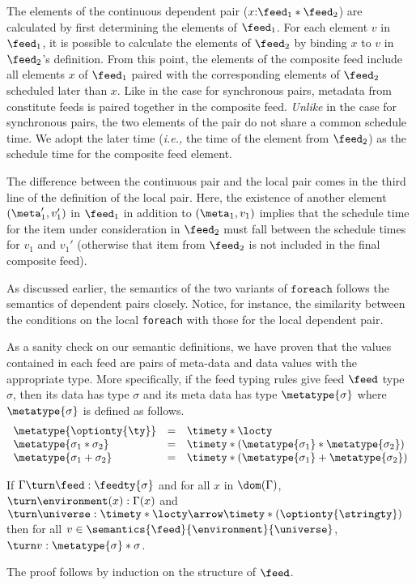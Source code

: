The elements of the continuous dependent pair ($x{:}\feed_1 * \feed_2$)
are calculated by first determining the elements of $\feed_1$. 
For each element $v$ in $\feed_1$, it is possible to calculate
the elements of $\feed_2$ by binding $x$ to $v$ in $\feed_2$'s definition.
From this point, the elements of the composite feed include all elements
$x$ of $\feed_1$ paired with the corresponding elements of $\feed_2$ scheduled
later than $x$.  Like in the case for synchronous pairs, metadata from 
constitute feeds is paired together in the composite feed.  {\em Unlike}
in the case for synchronous pairs, the two elements of the pair do
not share a common schedule time.  We adopt the later time ({\em i.e.,}
the time of the element from $\feed_2$) as the schedule time for the
composite feed element.

The difference between the continuous pair and the local pair
comes in the third line of the definition of the local pair.
Here, the existence of another element $(\meta_1',v_1')$
in $\feed_1$ in addition to $(\meta_1,v_1)$ implies that the 
schedule time for the item under consideration in $\feed_2$
must fall between the schedule times for $v_1$ and $v_1'$
(otherwise that item from $\feed_2$ is not included in the
final composite feed). 

As discussed earlier, the semantics of the two variants of $\mathtt{foreach}$
follows the semantics of dependent pairs closely.  Notice, for instance,
the similarity between the conditions on the local {\tt foreach} with those
for the local dependent pair.

As a sanity check on our semantic definitions, we have proven
that the values contained in each feed are pairs of meta-data and data
values with the appropriate type.  More specifically, if the feed typing
rules give feed $\feed$ type $\sigma$, then its data has type $\sigma$ and
its meta data has type $\metatype{\sigma}$ where $\metatype{\sigma}$ is
defined as follows.
\[
\begin {array} {lcl}
\metatype{\optionty{\ty}} & = & \timety * \locty \\
\metatype{\sigma_1 * \sigma_2} & = & \timety * (\metatype{\sigma_1} * \metatype{\sigma_2}) \\
\metatype{\sigma_1 + \sigma_2} & = & \timety * (\metatype{\sigma_1} + \metatype{\sigma_2}) 
\end{array}
\]
\begin{theorem}
If $\Gamma \turn \feed : \feedty{\sigma}$ and
for all $x$ in $\dom(\Gamma)$, $\turn \environment(x) : \Gamma(x)$
and $\turn \universe : \timety * \locty \arrow \timety * (\optionty{\stringty})$
then
for all $v \in \semantics{\feed}{\environment}{\universe}$,
$\turn v : \metatype{\sigma} * \sigma$. 
\end{theorem}
The proof follows by induction on the structure of $\feed$.



